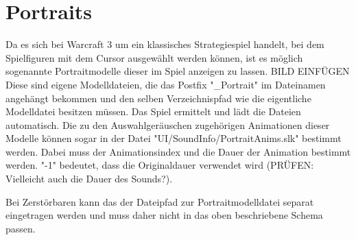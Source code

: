 \chapter{Portraits}
Da es sich bei Warcraft 3 um ein klassisches Strategiespiel handelt, bei dem Spielfiguren mit dem Cursor ausgewählt werden können, ist es möglich sogenannte Portraitmodelle dieser im Spiel anzeigen zu lassen.
BILD EINFÜGEN
Diese sind eigene Modelldateien, die das Postfix "_Portrait" im Dateinamen angehängt bekommen und den selben Verzeichnispfad wie die eigentliche Modelldatei besitzen müssen. Das Spiel ermittelt und lädt die Dateien automatisch.
Die zu den Auswahlgeräuschen zugehörigen Animationen dieser Modelle können sogar in der Datei "UI/SoundInfo/PortraitAnims.slk" bestimmt werden.
Dabei muss der Animationsindex und die Dauer der Animation bestimmt werden. "-1" bedeutet, dass die Originaldauer verwendet wird (PRÜFEN: Vielleicht auch die Dauer des Sounds?).

Bei Zerstörbaren kann das der Dateipfad zur Portraitmodelldatei separat eingetragen werden und muss daher nicht in das oben beschriebene Schema passen.